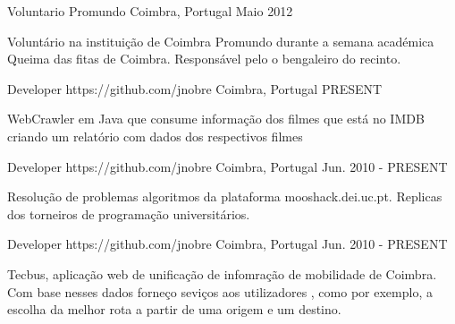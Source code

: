 


\begin{cventries}


\cventry
{Voluntario} %
{Promundo} %
{Coimbra, Portugal} %
{Maio 2012} %
{ %
\begin{cvitems}
\item {Voluntário na instituição de Coimbra Promundo durante a semana académica Queima das fitas de Coimbra. Responsável pelo o bengaleiro do recinto. }
\end{cvitems}
}


\cventry
{Developer} %
{https://github.com/jnobre} %
{Coimbra, Portugal} %
{ PRESENT} %
{ %
\begin{cvitems}
\item {WebCrawler em Java que  consume informação dos filmes que está no IMDB criando um relatório com dados dos respectivos filmes}
\end{cvitems}
}


\cventry
{Developer} %
{https://github.com/jnobre} %
{Coimbra, Portugal} %
{Jun. 2010 - PRESENT} %
{ %
\begin{cvitems}
\item {Resolução de problemas algoritmos da plataforma  mooshack.dei.uc.pt.  Replicas dos torneiros de programação universitários. }
\end{cvitems}
}


\cventry
{Developer} %
{https://github.com/jnobre} %
{Coimbra, Portugal} %
{Jun. 2010 - PRESENT} %
{ %
\begin{cvitems}
\item {Tecbus, aplicação web de unificação de infomração de mobilidade de Coimbra. Com base nesses dados forneço seviços aos utilizadores , como por exemplo, a escolha da melhor rota a partir de uma origem e um destino. }
\end{cvitems}
}


\end{cventries}